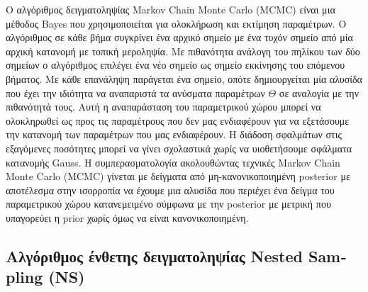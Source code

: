 Ο αλγόριθμος δειγματοληψίας \textlatin{Markov Chain Monte Carlo (MCMC)} είναι μια μέθοδος \textlatin{Bayes} που χρησιμοποιείται για ολοκλήρωση και εκτίμηση παραμέτρων. Ο αλγόριθμος σε κάθε βήμα συγκρίνει ένα αρχικό σημείο με ένα τυχόν σημείο από μία αρχική κατανομή με τοπική μεροληψία. Με πιθανότητα ανάλογη του πηλίκου των δύο σημείων ο αλγόριθμος επιλέγει ένα νέο σημείο ως σημείο εκκίνησης του επόμενου βήματος. Με κάθε επανάληψη παράγεται ένα σημείο, οπότε δημιουργείται μία αλυσίδα που έχει την ιδιότητα να αναπαριστά τα ανύσματα παραμέτρων $\Theta$ σε αναλογία με την πιθανότητά τους. Αυτή η αναπαράσταση του παραμετρικού χώρου μπορεί να ολοκληρωθεί ως προς τις παραμέτρους που δεν μας ενδιαφέρουν για να εξετάσουμε την κατανομή των παραμέτρων που μας ενδιαφέρουν.  
Η διάδοση σφαλμάτων στις εξαγόμενες ποσότητες μπορεί να γίνει σχολαστικά χωρίς να υιοθετήσουμε σφάλματα κατανομής \textlatin{Gauss}\cite{BuchnerGeorgakakis}.
H συμπερασματολογία ακολουθώντας τεχνικές \textlatin{Markov Chain Monte Carlo (MCMC)} γίνεται με δείγματα από μη-κανονικοποιημένη \textlatin{posterior} με αποτέλεσμα στην ισορροπία να έχουμε μια αλυσίδα που περιέχει ένα δείγμα του παραμετρικού χώρου κατανεμειμένο σύμφωνα με την \textlatin{posterior} με μετρική που υπαγορεύει η \textlatin{prior} χωρίς όμως να είναι κανονικοποιημένη. 

\subsection{Αλγόριθμος ένθετης δειγματοληψίας \textlatin{Nested Sampling (NS)}}

